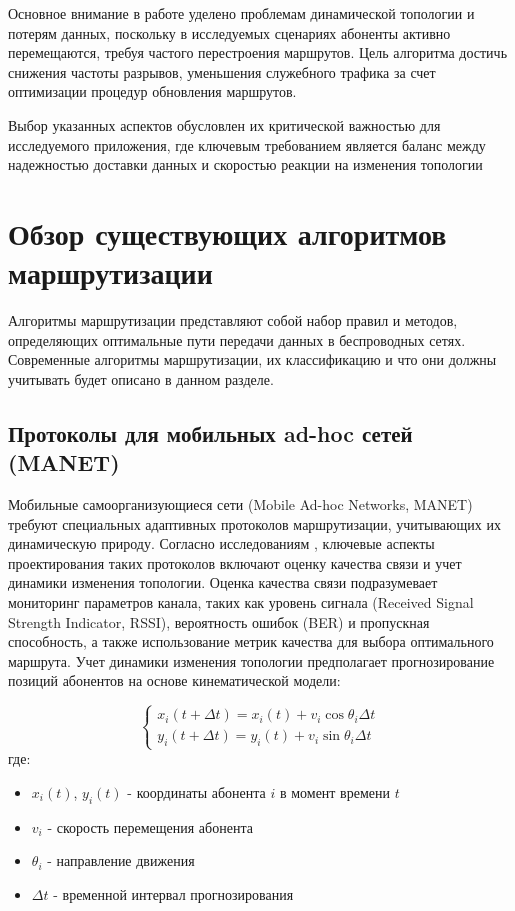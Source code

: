 Основное внимание в работе уделено проблемам динамической топологии и потерям данных, поскольку в исследуемых сценариях абоненты активно перемещаются, 
требуя частого перестроения маршрутов. Цель алгоритма достичь снижения частоты разрывов, уменьшения служебного трафика за счет оптимизации процедур 
обновления маршрутов.

Выбор указанных аспектов обусловлен их критической важностью для исследуемого приложения, где ключевым требованием является баланс между надежностью 
доставки данных и скоростью реакции на изменения топологии

\section{Обзор существующих алгоритмов маршрутизации} \label{ch1:sec2} 

Алгоритмы маршрутизации представляют собой набор правил и методов, определяющих оптимальные пути передачи данных в беспроводных сетях. 
Современные алгоритмы маршрутизации, их классификацию и что они должны учитывать будет описано в данном разделе.

\subsection{Протоколы для мобильных ad-hoc сетей (MANET)} \label{ch1:sec2:subsec1}

Мобильные самоорганизующиеся сети (Mobile Ad-hoc Networks, MANET) требуют специальных адаптивных протоколов маршрутизации, учитывающих их динамическую 
природу. Согласно исследованиям \cite{perkins2001performance}, ключевые аспекты проектирования таких протоколов включают оценку качества связи и учет 
динамики изменения топологии. Оценка качества связи подразумевает мониторинг параметров канала, таких как уровень 
сигнала (Received Signal Strength Indicator, RSSI), вероятность ошибок (BER) и пропускная способность, а также использование метрик качества для выбора 
оптимального маршрута. 
Учет динамики изменения топологии предполагает прогнозирование позиций абонентов на основе кинематической модели:

\begin{equation}
\label{eq:node_movement}
\begin{cases} 
x_i(t + \Delta t) = x_i(t) + v_i \cos\theta_i \Delta t \\
y_i(t + \Delta t) = y_i(t) + v_i \sin\theta_i \Delta t 
\end{cases}
\end{equation}
где:
\begin{itemize}
    \item $x_i(t)$, $y_i(t)$ - координаты абонента $i$ в момент времени $t$
    \item $v_i$ - скорость перемещения абонента
    \item $\theta_i$ - направление движения
    \item $\Delta t$ - временной интервал прогнозирования
\end{itemize}

